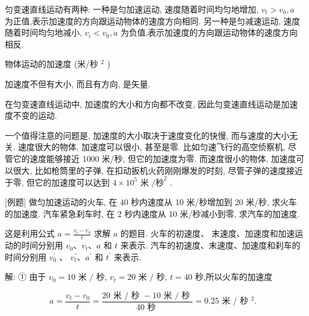 \documentclass[10pt]{article}
\begin{document}
匀变速直线运动有两种: 一种是匀加速运动, 速度随着时间均匀地增加, \({v}_{t} > {v}_{0},a\) 为正值,表示加速度的方向跟运动物体的速度方向相同. 另一种是匀减速运动, 速度随着时间均匀地减小, \({v}_{i} < {v}_{0},a\) 为负值,表示加速度的方向跟运动物体的速度方向相反.

物体运动的加速度 (米/秒 \({}^{2}\) )

\begin{center}
\end{center}

加速度不但有大小, 而且有方向, 是矢量.

在匀变速直线运动中, 加速度的大小和方向都不改变, 因此匀变速直线运动是加速度不变的运动.

一个值得注意的问题是, 加速度的大小取决于速度变化的快慢, 而与速度的大小无关. 速度很大的物体, 加速度可以很小, 甚至是零. 比如匀速飞行的高空侦察机, 尽管它的速度能够接近 1000 米/秒, 但它的加速度为零. 而速度很小的物体, 加速度可以很大, 比如枪筒里的子弹, 在扣动扳机火药刚刚爆发的时刻, 尽管子弹的速度接近于零, 但它的加速度可以达到 \(4 \times {10}^{5}\) 米 \(/{\text{秒}}^{2}\) .

[例题] 做匀加速运动的火车, 在 40 秒内速度从 10 米/秒增加到 20 米/秒, 求火车的加速度. 汽车紧急刹车时, 在 2 秒内速度从 10 米/秒减小到零, 求汽车的加速度.

这是利用公式 \(a = \frac{{v}_{t} - {v}_{0}}{t}\) 求解 \(a\) 的题目. 火车的初速度、 末速度、加速度和加速运动的时间分别用 \({v}_{0}\text{、}{v}_{t}\text{、}a\) 和 \(t\) 来表示. 汽车的初速度、末速度、加速度和刹车的时间分别用 \({v}_{0}^{\prime }\) 、 \({v}_{t}^{\prime }\text{、}{a}^{\prime }\) 和 \({t}^{\prime }\) 来表示.

解: ① 由于 \({v}_{0} = {10}\) 米 \(/\) 秒, \({v}_{t} = {20}\) 米 \(/\) 秒, \(t = {40}\) 秒,所以火车的加速度

\[
a = \frac{{v}_{t} - {v}_{0}}{t} = \frac{{20}\text{ 米 }/\text{ 秒 } - {10}\text{ 米 }/\text{ 秒 }}{{40}\text{ 秒 }} = {0.25}\text{ 米 }/\text{ 秒 }{}^{2}\text{. }
\]
\end{document}
